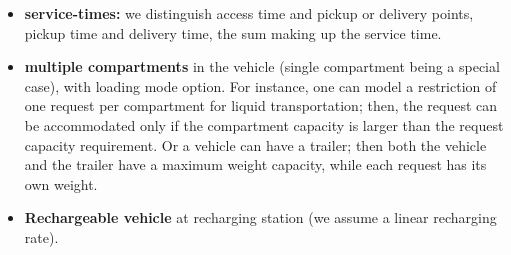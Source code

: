\documentclass[12pt,a4paper]{article}
\begin{document}
\begin{itemize}
\item {\bf  service-times:} we distinguish access time and pickup or delivery points, pickup time and delivery time, the sum making up the service time.
\item {\bf multiple compartments} in the vehicle (single compartment being a special case), with loading mode option. For instance, one can model a restriction of one request per compartment for liquid transportation; then, the request can be accommodated only if the compartment capacity is larger than the request capacity requirement. Or a vehicle can have a trailer; then both the vehicle and the trailer have a maximum weight capacity, while each request has its own weight. 
\item {\bf Rechargeable vehicle} at recharging station (we assume a linear recharging rate).

\end{itemize}

\noindent 
\end{document}
